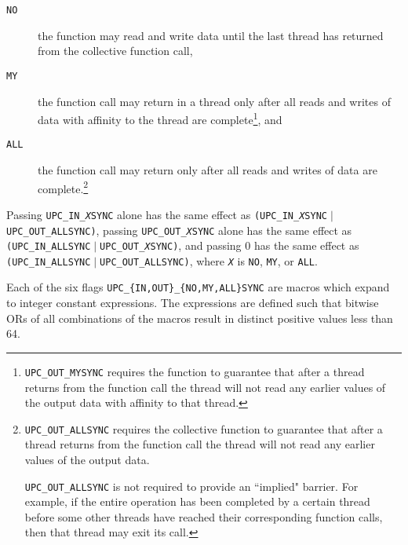 \begin{description}
    \item[{\tt NO}] the function may read and write data until
    the last thread has returned from the collective function call,

    \item[{\tt MY}] the function call may return in a thread
    only after all reads and writes of data with affinity to the thread
    are complete\footnote{{\tt UPC\_OUT\_MYSYNC} requires the 
  function to guarantee that after a thread returns from the
  function call the thread will not read any earlier values of the
  output data with affinity to that thread.}, and

    \item[{\tt ALL}] the function call may return only after
  all reads and writes of data are complete.\footnote{{\tt UPC\_OUT\_ALLSYNC}
  requires the collective function to guarantee that after a thread returns
  from the function call the thread will not read any earlier
  values of the output data.

  {\tt UPC\_OUT\_ALLSYNC} is not required to provide an ``implied"
  barrier.  For example, if the entire operation has been
  completed by a certain thread before some other threads have reached
  their corresponding function calls, then that thread may exit its call.}
\end{description}

\np Passing {\tt UPC\_IN\_{\em X}SYNC} alone has the same effect as
   {\tt (UPC\_IN\_{\em X}SYNC}$\;|\;${\tt UPC\_OUT\_ALLSYNC)},
   passing {\tt UPC\_OUT\_{\em X}SYNC} alone has the same effect as
   {\tt (UPC\_IN\_ALLSYNC}$\;|\;${\tt UPC\_OUT\_{\em X}SYNC)},
   and passing 0 has the same effect as
   {\tt (UPC\_IN\_ALLSYNC}$\;|\;${\tt UPC\_OUT\_ALLSYNC)},
   where {\tt {\em X}} is {\tt NO}, {\tt MY}, or {\tt ALL}.
   
\np Each of the six flags {\tt UPC\_\{IN,OUT\}\_\{NO,MY,ALL\}SYNC} are
   macros which expand to integer constant expressions.  The expressions
   are defined such that bitwise ORs of all combinations of the macros result
   in distinct positive values less than 64.
